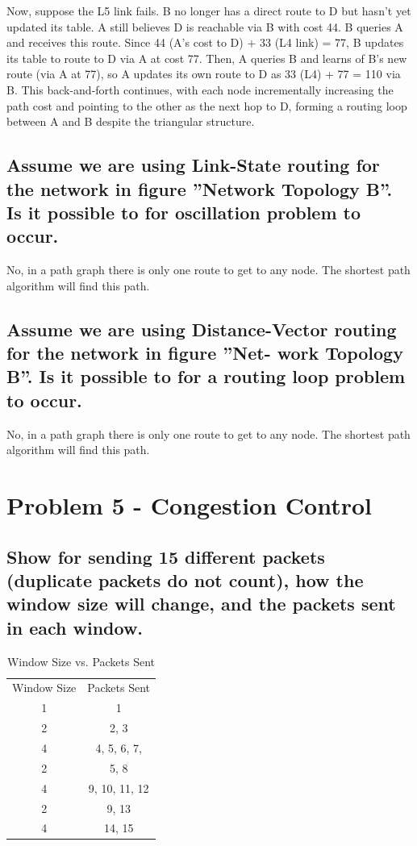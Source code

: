 \documentclass{article}
\begin{document}
Now, suppose the L5 link fails. B no longer has a direct route to D but hasn't yet updated its table.
A still believes D is reachable via B with cost 44. 
B queries A and receives this route. Since 44 (A's cost to D) + 33 (L4 link) = 77, B updates its table
to route to D via A at cost 77. Then, A queries B and learns of B's new route (via A at 77), so A updates its own route to D as 33 (L4) + 77 = 110 via B. 
This back-and-forth continues, with each node incrementally increasing the path cost and pointing to the other as the next hop to D, forming a routing loop between 
A and B despite the triangular structure.

\subsection{Assume we are using Link-State routing for the network in figure ”Network
Topology B”. Is it possible to for oscillation problem to occur.}

No, in a path graph there is only one route to get to any node. The shortest path algorithm will find this path.

\subsection{Assume we are using Distance-Vector routing for the network in figure ”Net-
work Topology B”. Is it possible to for a routing loop problem to occur.}

No, in a path graph there is only one route to get to any node. The shortest path algorithm will find this path.


\section{Problem 5 - Congestion Control}

\subsection{Show for sending 15 different packets (duplicate packets do not count), how the
window size will change, and the packets sent in each window.}

	\begin{table}[h]
		\centering
		\begin{tabular}{cc}
			Window Size & Packets Sent \\
			1 & 1 \\
			2 & 2, 3 \\
			4 & 4, 5, 6, 7, \\
			2 & 5, 8 \\
			4 & 9, 10, 11, 12 \\
			2 & 9, 13 \\
			4 & 14, 15 \\
		\end{tabular}
		\caption{Window Size vs. Packets Sent}
		\label{tab:window_packets}
	\end{table}
\end{document}
